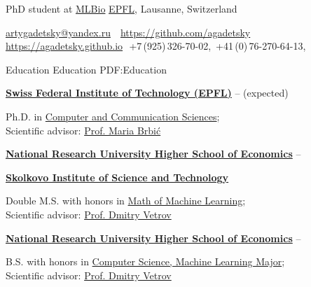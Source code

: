 \documentclass[letterpaper,MMMyyyy,nonstopmode]{simpleresumecv}
\newcommand{\CVAuthor}{Artyom Gadetsky}
\begin{document}

\Title{\CVAuthor}

\begin{SubTitle}
PhD student at \href{https://brbiclab.epfl.ch}{MLBio}
\href{https://www.epfl.ch/schools/ic/}{EPFL}, Lausanne, Switzerland
\par
\href{mailto:artygadetsky@yandex.ru}{artygadetsky@yandex.ru}
\,\SubBulletSymbol\,
\href{https://github.com/agadetsky}{https://github.com/agadetsky}
\,\SubBulletSymbol\,\href{https://agadetsky.github.io}{https://agadetsky.github.io}\,\SubBulletSymbol\,
+7\,(925)\,326-70-02,\ +41\,(0)\,76-270-64-13,
\end{SubTitle}

\begin{Body}


\Section
{Education}
{Education}
{PDF:Education}

\Entry
\href{https://www.epfl.ch/}
{\textbf{Swiss Federal Institute of Technology (EPFL)}}
\hfill
{} --
 (expected)
\begin{Detail}
Ph.D. in
\href{https://www.epfl.ch/schools/ic/}
{Computer and Communication Sciences};\\Scientific advisor: \href{http://brbiclab.epfl.ch}{Prof. Maria Brbić}
\end{Detail}
\Gap

\Entry
\href{https://www.hse.ru/en/}
{\textbf{National Research University Higher School of Economics}}
\hfill
{} --
\par
\href{https://www.skoltech.ru/en/}{\textbf{Skolkovo Institute of Science and Technology}}
\par
\begin{Detail}
Double M.S. with honors in
\href{https://www.hse.ru/en/ma/sltheory/}
{Math of Machine Learning};\\
Scientific advisor: \href{http://bayesgroup.org}{Prof. Dmitry Vetrov}
\end{Detail}
\Gap

\Entry
\href{https://www.hse.ru/en/}
{\textbf{National Research University Higher School of Economics}}
\hfill
{} --
\begin{Detail}
B.S. with honors in \href{https://www.hse.ru/en/ba/ami/}{Computer Science, Machine Learning Major};\\
Scientific advisor: \href{http://bayesgroup.org}{Prof. Dmitry Vetrov}
\end{Detail}


\end{Body}
\end{document}
